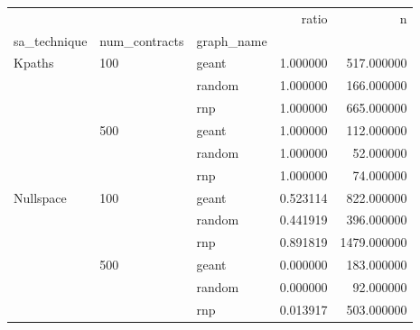 \begin{tabular}{lllrr}
\toprule
 &  &  & ratio & n \\
sa_technique & num_contracts & graph_name &  &  \\
\midrule
\multirow[t]{6}{*}{Kpaths} & \multirow[t]{3}{*}{100} & geant & 1.000000 & 517.000000 \\
 &  & random & 1.000000 & 166.000000 \\
 &  & rnp & 1.000000 & 665.000000 \\
\cline{2-5}
 & \multirow[t]{3}{*}{500} & geant & 1.000000 & 112.000000 \\
 &  & random & 1.000000 & 52.000000 \\
 &  & rnp & 1.000000 & 74.000000 \\
\cline{1-5} \cline{2-5}
\multirow[t]{6}{*}{Nullspace} & \multirow[t]{3}{*}{100} & geant & 0.523114 & 822.000000 \\
 &  & random & 0.441919 & 396.000000 \\
 &  & rnp & 0.891819 & 1479.000000 \\
\cline{2-5}
 & \multirow[t]{3}{*}{500} & geant & 0.000000 & 183.000000 \\
 &  & random & 0.000000 & 92.000000 \\
 &  & rnp & 0.013917 & 503.000000 \\
\cline{1-5} \cline{2-5}
\bottomrule
\end{tabular}
